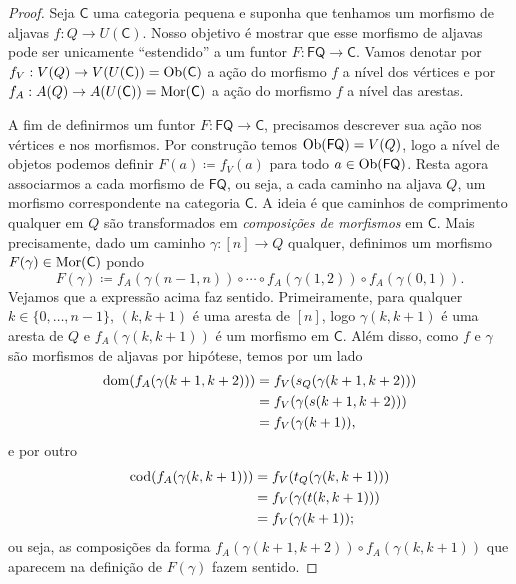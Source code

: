 \begin{proof}
    Seja $\mathsf{C}$ uma categoria pequena e suponha que tenhamos um morfismo de aljavas $f: Q \to U(\mathsf{C})$.
    Nosso objetivo é mostrar que esse morfismo de aljavas pode ser unicamente ``estendido'' a um funtor $F: \mathsf{FQ} \to \mathsf{C}$.
    Vamos denotar por $f_V: V(Q) \to V(U(\mathsf{C})) = \mathrm{Ob}(\mathsf{C})$ a ação do morfismo $f$ a nível dos vértices e por $f_A: A(Q) \to A(U(\mathsf{C})) = \mathrm{Mor}(\mathsf{C})$ a ação do morfismo $f$ a nível das arestas.

    A fim de definirmos um funtor $F: \mathsf{FQ} \to \mathsf{C}$, precisamos descrever sua ação nos vértices e nos morfismos.
    Por construção temos $\mathrm{Ob}(\mathsf{FQ}) = V(Q)$, logo a nível de objetos podemos definir $F(a) \coloneqq f_V(a)$ para todo $a \in \mathrm{Ob}(\mathsf{FQ})$.
    Resta agora associarmos a cada morfismo de $\mathsf{FQ}$, ou seja, a cada caminho na aljava $Q$, um morfismo correspondente na categoria $\mathsf{C}$.
    A ideia é que caminhos de comprimento qualquer em $Q$ são transformados em \emph{composições de morfismos} em $\mathsf{C}$.
    Mais precisamente, dado um caminho $\gamma: [n] \to Q$ qualquer, definimos um morfismo $F(\gamma) \in \mathrm{Mor}(\mathsf{C})$ pondo
    \begin{displaymath}
        F(\gamma) \coloneqq f_A(\gamma(n-1,n)) \circ \dotsm \circ f_A(\gamma(1,2)) \circ f_A(\gamma(0,1)).
    \end{displaymath}
    Vejamos que a expressão acima faz sentido.
    Primeiramente, para qualquer $k \in \{0,\dots,n-1\}$, $(k,k+1)$ é uma aresta de $[n]$, logo $\gamma(k,k+1)$ é uma aresta de $Q$ e $f_A(\gamma(k,k+1))$ é um morfismo em $\mathsf{C}$.
    Além disso, como $f$ e $\gamma$ são morfismos de aljavas por hipótese, temos por um lado
    \begin{align*}
        \mathrm{dom}(f_A(\gamma(k+1,k+2)))
        & = f_V(s_Q(\gamma(k+1,k+2))) \\
        & = f_V(\gamma(s(k+1,k+2))) \\
        & = f_V(\gamma(k+1)),
    \end{align*}
    e por outro
    \begin{align*}
        \mathrm{cod}(f_A(\gamma(k,k+1)))
        & = f_V(t_Q(\gamma(k,k+1))) \\
        & = f_V(\gamma(t(k,k+1))) \\
        & = f_V(\gamma(k+1));
    \end{align*}
    ou seja, as composições da forma $f_A(\gamma(k+1,k+2)) \circ f_A(\gamma(k,k+1))$ que aparecem na definição de $F(\gamma)$ fazem sentido.


\end{proof}
